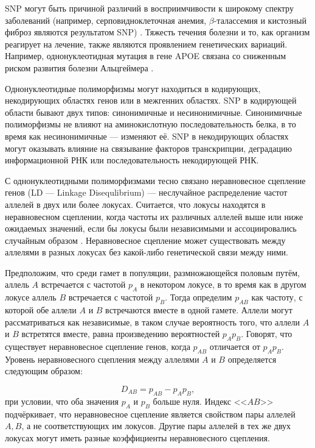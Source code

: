 SNP могут быть причиной различий в восприимчивости к широкому спектру заболеваний (например, серповидноклеточная анемия, $\beta$-талассемия и кистозный фиброз являются результатом SNP) \autocite{INGRAM1956, Chang1979, Reiss1993}. Тяжесть течения болезни и то, как организм реагирует на лечение, также являются проявлением генетических вариаций. Например, однонуклеотидная мутация в гене APOE связана со сниженным риском развития болезни Альцгеймера \autocite{Wolf2013}.

Однонуклеотидные полиморфизмы могут находиться в кодирующих, некодирующих областях генов или в межгенних областях. SNP в кодирующей области бывают двух типов: синонимичные и несинонимичные. Синонимичные полиморфизмы не влияют на аминокислотную последовательность белка, в то время как несинонимичные --- изменяют её. SNP в некодирующих областях могут оказывать влияние на связывание факторов транскрипции, деградацию информационной РНК или последовательность некодирующей РНК. 


С однонуклеотидными полиморфизмами тесно связано неравновесное сцепление генов (LD --- Linkage Disequlibrium) --- неслучайное распределение частот аллелей в двух или более локусах. Считается, что локусы находятся в неравновесном сцеплении, когда частоты их различных аллелей выше или ниже ожидаемых значений, если бы локусы были независимыми и ассоциировались случайным образом \autocite{Slatkin2008}. Неравновесное сцепление может существовать между аллелями в разных локусах без какой-либо генетической связи между ними. 

Предположим, что среди гамет в популяции, размножающейся половым путём, аллель $A$ встречается с частотой $p_{A}$ в некотором локусе, в то время как в другом локусе аллель $B$ встречается с частотой $p_{B}$. Тогда определим $p_{AB}$ как частоту, с которой обе аллели $A$ и $B$ встречаются вместе в одной гамете. Аллели могут рассматриваться как независимые, в таком случае вероятность того, что аллели $A$ и $B$ встретятся вместе, равна произведению вероятностей $p_{A}p_{B}$. Говорят, что существует неравновесное сцепление генов, когда $p_{AB}$ отличается от $p_{A}p_{B}$. Уровень неравновесного сцепления между аллелями $A$ и $B$ определяется следующим образом: 

\begin{equation}
\label{eq:LD}
D_{AB} = p_{AB} - p_{A}p_{B},
\end{equation}
при условии, что оба значения $p_{A}$ и $p_{B}$ больше нуля. Индекс <<$AB$>> подчёркивает, что неравновесное сцепление является свойством пары аллелей ${A, B}$, а не соответствующих им локусов. Другие пары аллелей в тех же двух локусах могут иметь разные коэффициенты неравновесного сцепления.

